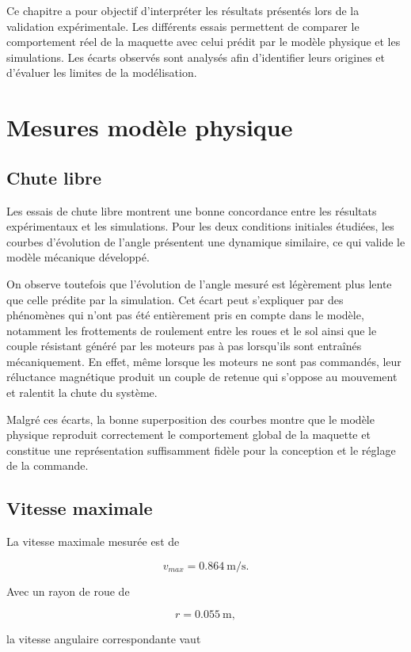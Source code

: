 
Ce chapitre a pour objectif d'interpréter les résultats présentés lors de la validation expérimentale. Les différents essais permettent de comparer le comportement réel de la maquette avec celui prédit par le modèle physique et les simulations. Les écarts observés sont analysés afin d'identifier leurs origines et d'évaluer les limites de la modélisation.

\section{Mesures modèle physique}

\subsection{Chute libre}

Les essais de chute libre montrent une bonne concordance entre les résultats expérimentaux et les simulations. Pour les deux conditions initiales étudiées, les courbes d'évolution de l'angle présentent une dynamique similaire, ce qui valide le modèle mécanique développé.

On observe toutefois que l'évolution de l'angle mesuré est légèrement plus lente que celle prédite par la simulation. Cet écart peut s'expliquer par des phénomènes qui n'ont pas été entièrement pris en compte dans le modèle, notamment les frottements de roulement entre les roues et le sol ainsi que le couple résistant généré par les moteurs pas à pas lorsqu'ils sont entraînés mécaniquement. En effet, même lorsque les moteurs ne sont pas commandés, leur réluctance magnétique produit un couple de retenue qui s'oppose au mouvement et ralentit la chute du système.

Malgré ces écarts, la bonne superposition des courbes montre que le modèle physique reproduit correctement le comportement global de la maquette et constitue une représentation suffisamment fidèle pour la conception et le réglage de la commande.
\subsection{Vitesse maximale}

La vitesse maximale mesurée est de

\[
v_{max}=0.864~\si{\meter\per\second}.
\]

Avec un rayon de roue de

\[
r=0.055~\si{\meter},
\]

la vitesse angulaire correspondante vaut

